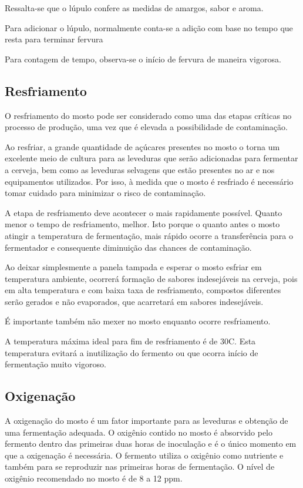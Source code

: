 Ressalta-se que o lúpulo confere as medidas de amargos, sabor e aroma.

Para adicionar o lúpulo, normalmente conta-se a adição com base no tempo que resta para terminar fervura

Para contagem de tempo, observa-se o início de fervura de maneira vigorosa.

\subsection{Resfriamento}

O resfriamento do mosto pode ser considerado como uma das etapas críticas no processo de produção, uma vez que é elevada a possibilidade de contaminação.

Ao resfriar, a grande quantidade de açúcares presentes no mosto o torna um excelente meio de cultura para as leveduras que serão adicionadas para fermentar a cerveja, bem como as leveduras selvagens que estão presentes no ar e nos equipamentos utilizados. Por isso, à medida que o mosto é resfriado é necessário tomar cuidado para minimizar o risco de contaminação.

A etapa de resfriamento deve acontecer o mais rapidamente possível. Quanto menor o tempo de resfriamento, melhor. Isto porque o quanto antes o mosto atingir a temperatura de fermentação, mais rápido ocorre a transferência para o fermentador e consequente diminuição das chances de contaminação.

Ao deixar simplesmente a panela tampada e esperar o mosto esfriar em temperatura ambiente, ocorrerá formação de sabores indesejáveis na cerveja, pois em alta temperatura e com baixa taxa de resfriamento, compostos diferentes serão gerados e não evaporados, que acarretará em sabores indesejáveis.

É importante também não mexer no mosto enquanto ocorre resfriamento.

A temperatura máxima ideal para fim de resfriamento é de 30\textdegree C. Esta temperatura evitará a inutilização do fermento ou que ocorra início de fermentação muito vigoroso.

\subsection{Oxigenação}
 A oxigenação do mosto é um fator importante para as leveduras e obtenção de uma fermentação adequada. O oxigênio contido no mosto é absorvido pelo fermento dentro das primeiras duas horas de inoculação e é o único momento em que a oxigenação é necessária. O fermento utiliza o oxigênio como nutriente e também para se reproduzir nas primeiras horas de fermentação. O nível de oxigênio recomendado no mosto é de 8 a 12 ppm.

